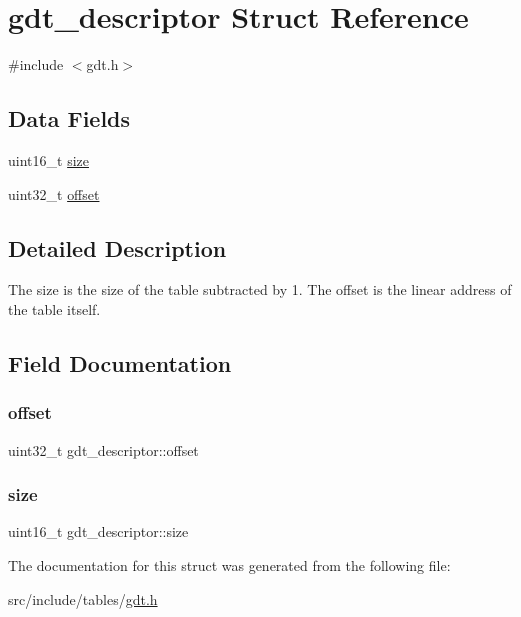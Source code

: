 \hypertarget{structgdt__descriptor}{}\section{gdt\+\_\+descriptor Struct Reference}
\label{structgdt__descriptor}


{\ttfamily \#include $<$gdt.\+h$>$}

\subsection*{Data Fields}
\begin{DoxyCompactItemize}
\item 
uint16\+\_\+t \hyperlink{structgdt__descriptor_ac1d1f417f0dea5075fda70333b4e609e}{size}
\item 
uint32\+\_\+t \hyperlink{structgdt__descriptor_aaa919aae6d3a2f010e359233a17bc0c5}{offset}
\end{DoxyCompactItemize}


\subsection{Detailed Description}
The size is the size of the table subtracted by 1. The offset is the linear address of the table itself. 

\subsection{Field Documentation}
\mbox{\label{structgdt__descriptor_aaa919aae6d3a2f010e359233a17bc0c5}} 
\subsubsection{\texorpdfstring{offset}{offset}}
{\footnotesize\ttfamily uint32\+\_\+t gdt\+\_\+descriptor\+::offset}

\mbox{\label{structgdt__descriptor_ac1d1f417f0dea5075fda70333b4e609e}} 
\subsubsection{\texorpdfstring{size}{size}}
{\footnotesize\ttfamily uint16\+\_\+t gdt\+\_\+descriptor\+::size}



The documentation for this struct was generated from the following file\+:\begin{DoxyCompactItemize}
\item 
src/include/tables/\hyperlink{gdt_8h}{gdt.\+h}\end{DoxyCompactItemize}
